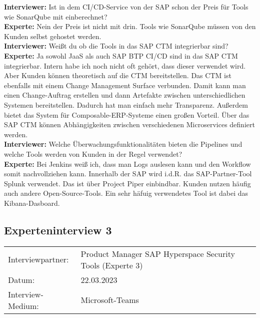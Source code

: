 \begin{linenumbers}
    \textbf{Interviewer:} Ist in dem CI/CD-Service von der SAP schon der Preis für Tools wie SonarQube mit einberechnet?\\
    \textbf{Experte:} Nein der Preis ist nicht mit drin. Tools wie SonarQube müssen von den Kunden selbst gehostet werden.\\
    \textbf{Interviewer:} Weißt du ob die Tools in das SAP CTM integrierbar sind?\\
    \textbf{Experte:} Ja sowohl JaaS als auch SAP BTP CI/CD sind in das SAP CTM integrierbar. Intern habe ich noch nicht oft gehört, dass dieser verwendet wird. Aber Kunden können theoretisch auf die CTM bereitstellen. Das CTM ist ebenfalls mit einem Change Management Surface verbunden. Damit kann man einen Change-Auftrag erstellen und dann Artefakte zwischen unterschiedlichen Systemen bereitstellen. Dadurch hat man einfach mehr Transparenz. Außerdem bietet das System für Composable-ERP-Systeme einen großen Vorteil. Über das SAP CTM können Abhängigkeiten zwischen verschiedenen Microservices definiert werden.\\
    \textbf{Interviewer:} Welche Überwachungsfunktionalitäten bieten die Pipelines und welche Tools werden von Kunden in der Regel verwendet?\\
    \textbf{Experte:} Bei Jenkins weiß ich, dass man Logs auslesen kann und den Workflow somit nachvollziehen kann. Innerhalb der SAP wird i.d.R. das SAP-Partner-Tool Splunk verwendet. Das ist über Project Piper einbindbar. Kunden nutzen häufig auch andere Open-Source-Tools. Ein sehr häfuig verwendetes Tool ist dabei das Kibana-Dasboard.
\end{linenumbers}
\newpage
\resetlinenumber
\subsection{Experteninterview 3}
	\begin{tabular}{ l l }
		Interviewpartner: & Product Manager SAP Hyperspace Security Tools (Experte 3)\\
		Datum: & 22.03.2023\\
		Interview-Medium: & Microsoft-Teams\\
\end{tabular}\\\\

